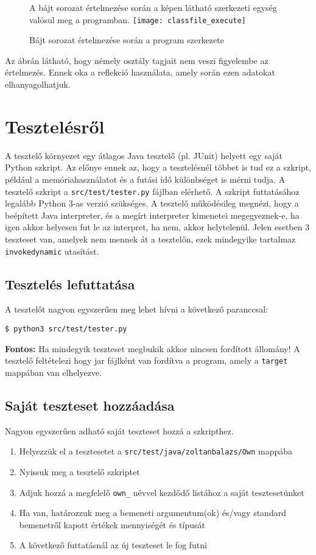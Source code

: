 \begin{figure}[H]
	A bájt sorozat értelmezése során a képen látható szerkezeti egység valósul meg a programban. 
	\centering
	\texttt{[image: classfile\_execute]}
	\caption{Bájt sorozat értelmezése során a program szerkezete}
	\label{fig:classfile_execute}
\end{figure}

Az ábrán látható, hogy némely osztály tagjait nem veszi figyelembe az értelmezés. Ennek oka a reflekció használata, amely során ezen adatokat elhanyagolhatjuk.

\section{Tesztelésről}

A tesztelő környezet egy átlagos Java tesztelő (pl. JUnit) helyett egy saját Python szkript. Az előnye ennek az, hogy a tesztelésnél többet is tud ez a szkript, például a memóriahasználatot és a futási idő különbséget is mérni tudja. A tesztelő szkript a \lstinline{src/test/tester.py} fájlban elérhető. A szkript futtatásához legalább Python 3-as verzió szükséges. A tesztelő működésileg megnézi, hogy a beépített Java interpreter, és a megírt interpreter kimenetei megegyeznek-e, ha igen akkor helyesen fut le az interpret, ha nem, akkor helytelenül. Jelen esetben 3 teszteset van, amelyek nem mennek át a tesztelőn, ezek mindegyike tartalmaz \lstinline{invokedynamic} utasítást.

\subsection{Tesztelés lefuttatása}

A tesztelőt nagyon egyszerűen meg lehet hívni a következő paranccsal:
\begin{verbatim}
$ python3 src/test/tester.py
\end{verbatim}

\textbf{Fontos:} Ha mindegyik teszteset megbukik akkor nincsen fordított állomány! A tesztelő feltételezi hogy jar fájlként van fordítva a program, amely a \lstinline{target} mappában van elhelyezve.

\subsection{Saját teszteset hozzáadása}

Nagyon egyszerűen adható saját teszteset hozzá a szkripthez.
\begin{enumerate}
	\item Helyezzük el a tesztesetet a \lstinline{src/test/java/zoltanbalazs/Own} mappába
	\item Nyissuk meg a tesztelő szkriptet
	\item Adjuk hozzá a megfelelő \lstinline{own_} névvel kezdődő listához a saját tesztesetünket
	\item Ha van, határozzuk meg a bemeneti argumentum(ok) és/vagy standard bemenetről kapott értékek mennyiségét és típusát
	\item A következő futtatásnál az új teszteset le fog futni
\end{enumerate}

